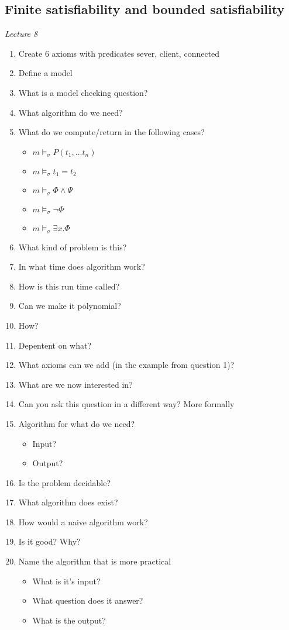 \documentclass[fleqn]{article}
\begin{document}
\subsection{Finite satisfiability and bounded satisfiability}
\textit{Lecture 8}
\begin{enumerate}
    \item Create 6 axioms with predicates sever, client, connected
    \item Define a model
    \item What is a model checking question?
    \item What algorithm do we need?
    \item What do we compute/return in the following cases?
    \begin{itemize}
        \item $m \models_{\sigma} P (t_1, \dots t_n)$
        \item $m \models_{\sigma} t_1 = t_2$
        \item $m \models_{\sigma} \Phi \wedge \Psi$
        \item $m \models_{\sigma} \neg \Phi$
        \item $m \models_{\sigma} \exists x. \Phi$
    \end{itemize}
    \item What kind of problem is this?
    \item In what time does algorithm work?
    \item How is this run time called?
    \item Can we make it polynomial?
    \item How?
    \item Depentent on what?
    \item What axioms can we add (in the example from question 1)?
    \item What are we now interested in?
    \item Can you ask this question in a different way? More formally
    \item Algorithm for what do we need?
    \begin{itemize}
        \item Input?
        \item Output?
    \end{itemize}
    \item Is the problem decidable?
    \item What algorithm does exist?
    \item How would a naive algorithm work?
    \item Is it good? Why?
    \item Name the algorithm that is more practical
    \begin{itemize}
        \item What is it's input?
        \item What question does it answer?
        \item What is the output?
    \end{itemize}
\end{enumerate}
\end{document}
